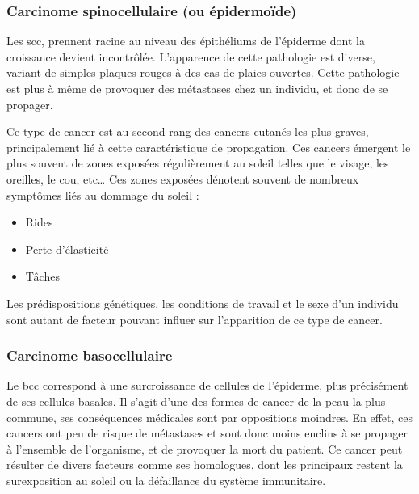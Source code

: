 \subsubsection{Carcinome spinocellulaire (ou épidermoïde)}
Les \gls{scc}, prennent racine au niveau des épithéliums de l’épiderme dont la croissance devient incontrôlée. L’apparence de cette pathologie est diverse, variant de simples plaques rouges à des cas de plaies ouvertes. Cette pathologie est plus à même de provoquer des métastases chez un individu, et donc de se propager.\par
Ce type de cancer est au second rang des cancers cutanés les plus graves, principalement lié à cette caractéristique de propagation. Ces cancers émergent le plus souvent de zones exposées régulièrement au soleil telles que le visage, les oreilles, le cou, etc… Ces zones exposées dénotent souvent de nombreux symptômes liés au dommage du soleil :
\begin{itemize}
\item Rides
\item Perte d’élasticité
\item Tâches
\end{itemize}
Les prédispositions génétiques, les conditions de travail et le sexe d’un individu sont autant de facteur pouvant influer sur l’apparition de ce type de cancer.\par

\subsubsection{Carcinome basocellulaire}	
Le \gls{bcc} correspond à une surcroissance de cellules de l’épiderme, plus précisément de ses cellules basales. Il s’agit d’une des formes de cancer de la peau la plus commune, ses conséquences médicales sont par oppositions moindres. En effet, ces cancers ont peu de risque de métastases et sont donc moins enclins à se propager à l’ensemble de l’organisme, et de provoquer la mort du patient. Ce cancer peut résulter de divers facteurs comme ses homologues, dont les principaux restent la surexposition au soleil ou la défaillance du système immunitaire.\par

